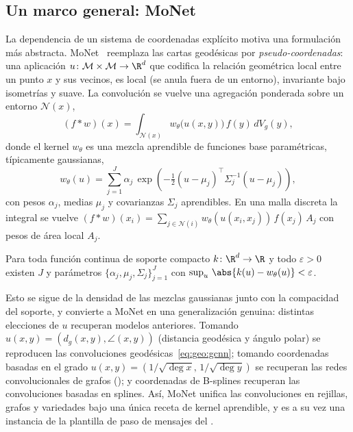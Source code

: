 \subsection{Un marco general: MoNet}
\label{subsec:geo:monet}

La dependencia de un sistema de coordenadas expl\'icito motiva una formulaci\'on
m\'as abstracta. MoNet~\citep{DBLP:journals/corr/MontiBMRSB16} reemplaza las
cartas geod\'esicas por \emph{pseudo-coordenadas}: una aplicaci\'on
$u \colon \M \times \M \to \R^d$ que codifica la relaci\'on geom\'etrica local
entre un punto $x$ y sus vecinos, es local (se anula fuera de un entorno),
invariante bajo isometr\'ias y suave. La convoluci\'on se vuelve una agregaci\'on
ponderada sobre un entorno $\mathcal{N}(x)$,
\begin{equation}
\label{eq:geo:monet}
  (f * w)(x) = \int_{\mathcal{N}(x)} w_\theta\big(u(x,y)\big)\, f(y)\, dV_g(y),
\end{equation}
donde el kernel $w_\theta$ es una mezcla aprendible de funciones base
param\'etricas, t\'ipicamente gaussianas,
\[
  w_\theta(u) = \sum_{j=1}^J \alpha_j\,
    \exp\!\left(-\tfrac{1}{2}(u - \mu_j)^\top \Sigma_j^{-1} (u - \mu_j)\right),
\]
con pesos $\alpha_j$, medias $\mu_j$ y covarianzas $\Sigma_j$ aprendibles. En una
malla discreta la integral se vuelve
$(f * w)(x_i) = \sum_{j \in \mathcal{N}(i)} w_\theta(u(x_i,x_j))\, f(x_j)\, A_j$
con pesos de \'area local $A_j$.

\begin{theorem}
\label{thm:geo:monet}
Para toda funci\'on continua de soporte compacto $k \colon \R^d \to \R$ y todo
$\varepsilon > 0$ existen $J$ y par\'ametros
$\{\alpha_j, \mu_j, \Sigma_j\}_{j=1}^J$ con
$\sup_{u}\, \abs{k(u) - w_\theta(u)} < \varepsilon$.
\end{theorem}

Esto se sigue de la densidad de las mezclas gaussianas junto con la compacidad
del soporte, y convierte a MoNet en una generalizaci\'on genuina: distintas
elecciones de $u$ recuperan modelos anteriores. Tomando
$u(x,y) = (d_g(x,y), \angle(x,y))$ (distancia geod\'esica y \'angulo polar) se
reproducen las convoluciones geod\'esicas~\eqref{eq:geo:gcnn}; tomando
coordenadas basadas en el grado $u(x,y) = (1/\sqrt{\deg x},\, 1/\sqrt{\deg y})$
se recuperan las redes convolucionales de grafos (); y
coordenadas de B-splines recuperan las convoluciones basadas en splines. As\'i,
MoNet unifica las convoluciones en rejillas, grafos y variedades bajo una \'unica
receta de kernel aprendible, y es a su vez una instancia de la plantilla de paso
de mensajes del .

